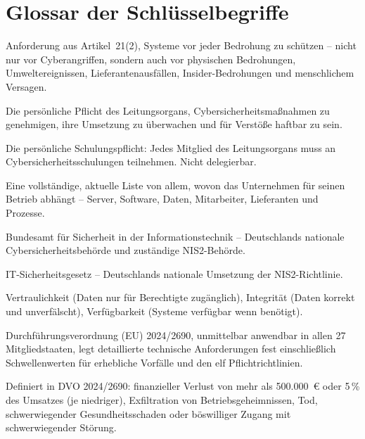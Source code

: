 \documentclass[11pt,a4paper,twoside]{book}
\begin{document}
\chapter{Glossar der Schlüsselbegriffe}

\begin{description}[style=nextline, leftmargin=0pt, labelindent=0pt, parsep=5pt, itemsep=2pt]

  \item[Allgefahrenansatz] Anforderung aus Artikel~21(2), Systeme vor jeder Bedrohung zu schützen -- nicht nur vor Cyberangriffen, sondern auch vor physischen Bedrohungen, Umweltereignissen, Lieferantenausfällen, Insider-Bedrohungen und menschlichem Versagen.

  \item[Artikel 20(1)] Die persönliche Pflicht des Leitungsorgans, Cybersicherheitsmaßnahmen zu genehmigen, ihre Umsetzung zu überwachen und für Verstöße haftbar zu sein.

  \item[Artikel 20(2)] Die persönliche Schulungspflicht: Jedes Mitglied des Leitungsorgans muss an Cybersicherheitsschulungen teilnehmen. Nicht delegierbar.

  \item[Asset-Inventar] Eine vollständige, aktuelle Liste von allem, wovon das Unternehmen für seinen Betrieb abhängt -- Server, Software, Daten, Mitarbeiter, Lieferanten und Prozesse.

  \item[BSI] Bundesamt für Sicherheit in der Informationstechnik -- Deutschlands nationale Cybersicherheitsbehörde und zuständige NIS2-Behörde.

  \item[BSIG] IT-Sicherheitsgesetz -- Deutschlands nationale Umsetzung der NIS2-Richtlinie.

  \item[CIA-Triade] Vertraulichkeit (Daten nur für Berechtigte zugänglich), Integrität (Daten korrekt und unverfälscht), Verfügbarkeit (Systeme verfügbar wenn benötigt).

  \item[DVO] Durchführungsverordnung (EU) 2024/2690, unmittelbar anwendbar in allen 27 Mitgliedstaaten, legt detaillierte technische Anforderungen fest einschließlich Schwellenwerten für erhebliche Vorfälle und den elf Pflichtrichtlinien.

  \item[Erheblicher Vorfall] Definiert in DVO 2024/2690: finanzieller Verlust von mehr als 500.000~\euro{} oder 5\,\% des Umsatzes (je niedriger), Exfiltration von Betriebsgeheimnissen, Tod, schwerwiegender Gesundheitsschaden oder böswilliger Zugang mit schwerwiegender Störung.


\end{description}
\end{document}
